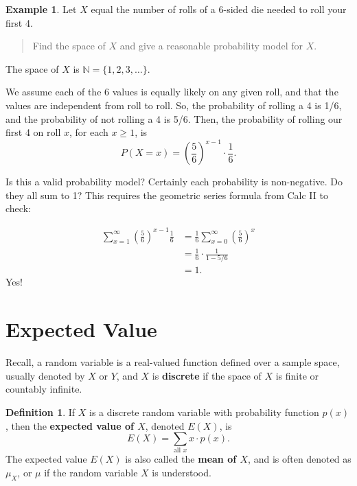 \documentclass[
]{book}
\theoremstyle{definition}
\newtheorem{definition}{Definition}[chapter]
\theoremstyle{definition}
\newtheorem{example}{Example}[chapter]
\theoremstyle{definition}
\theoremstyle{definition}
\theoremstyle{remark}
\begin{document}
\begin{example}
\protect\hypertarget{exm:roll-until-4}{}\label{exm:roll-until-4}Let \(X\) equal the number of rolls of a 6-sided die needed to roll your first 4.

\begin{quote}
Find the space of \(X\) and give a reasonable probability model for \(X\).
\end{quote}

The space of \(X\) is \(\mathbb{N} = \{1, 2, 3, \ldots \}\).

We assume each of the 6 values is equally likely on any given roll, and that the values are independent from roll to roll. So, the probability of rolling a 4 is 1/6, and the probability of not rolling a 4 is 5/6. Then, the probability of rolling our first 4 on roll \(x\), for each \(x \geq 1\), is
\[P(X = x) = \left(\frac{5}{6}\right)^{x-1}\cdot\frac{1}{6}.\]

Is this a valid probability model? Certainly each probability is non-negative. Do they all sum to 1? This requires the geometric series formula from Calc II to check:

\begin{align*}
\sum_{x = 1}^\infty \left(\frac{5}{6}\right)^{x-1}\frac{1}{6} &= \frac{1}{6}\sum_{x = 0}^\infty \left(\frac{5}{6}\right)^{x} \\
&= \frac{1}{6} \cdot \frac{1}{1-5/6} \\
&= 1.
\end{align*}
Yes!
\end{example}

\section{Expected Value}\label{expected-value}

Recall, a random variable is a real-valued function defined over a sample space, usually denoted by \(X\) or \(Y\), and \(X\) is \textbf{discrete} if the space of \(X\) is finite or countably infinite.

\begin{definition}
\protect\hypertarget{def:expected-value-discrete}{}\label{def:expected-value-discrete}If \(X\) is a discrete random variable with probability function \(p(x)\), then the \textbf{expected value of \(X\)}, denoted \(E(X)\), is \[E(X) = \sum_{\text{all }x} x \cdot p(x).\] The expected value \(E(X)\) is also called the \textbf{mean of \(X\)}, and is often denoted as \(\mu_X\), or \(\mu\) if the random variable \(X\) is understood.
\end{definition}
\end{document}
